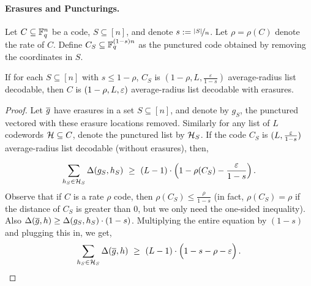 \paragraph{Erasures and Puncturings.}
Let $C \subseteq \F_q^n$ be a code, $S\subseteq [n]$, and denote $s:= \nfrac{|S|}{n}$. Let $\rho =
\rho(C)$ denote the rate of $C$. Define $C_S  \subseteq \F_q^{(1-s)n}$ as the punctured code obtained by removing the coordinates in $S$. 
\begin{claim}\label{claim:puncture}
If for each $S\subseteq [n]$ with  $s \leq 1-\rho$, $C_S$  is $(1-\rho,L, \frac{\varepsilon}{1-s} )$ average-radius list decodable, then $C$ is  $(1-\rho, L, \eps )$ average-radius list decodable with erasures.	
\end{claim}
\begin{proof}
	
Let $\erase{g}$ have erasures in a set $S\subseteq [n]$, and denote by $g_S$, the punctured vectored with these erasure locations removed. Similarly for any list of $L$ codewords $\calH \subseteq C$, denote the punctured list by $\calH_S$. If the code $C_S$ is $(L, \frac{\eps}{1-s} )$ average-radius list decodable (without erasures), then, 

\[
\sum_{h_S \in \calH_S} \Delta(g_S,h_S) ~\geq~ (L - 1) \cdot \parens[\Big]{1 - \rho(C_S) - \frac{\eps}{1-s} }\mper
\]
Observe that if $C$ is a rate $\rho$ code, then $\rho(C_S) \leq \frac{\rho}{1-s}$ (in fact,
$\rho(C_S) = \rho$ if the distance of $C_S$ is greater than 0, but we only need the one-sided inequality). Also $\Delta(\erase{g},h) \geq \Delta(g_S,h_S) \cdot (1-s)$. Multiplying the entire equation by $(1-s)$ and plugging this in, we get,
\[
\sum_{h_S \in \calH_S} \Delta(\erase{g},h) ~\geq~ (L - 1) \cdot \parens[\Big]{1-s - \rho - \eps }\mper \qedhere
\]%
\end{proof}


\vspace{-5 pt}
